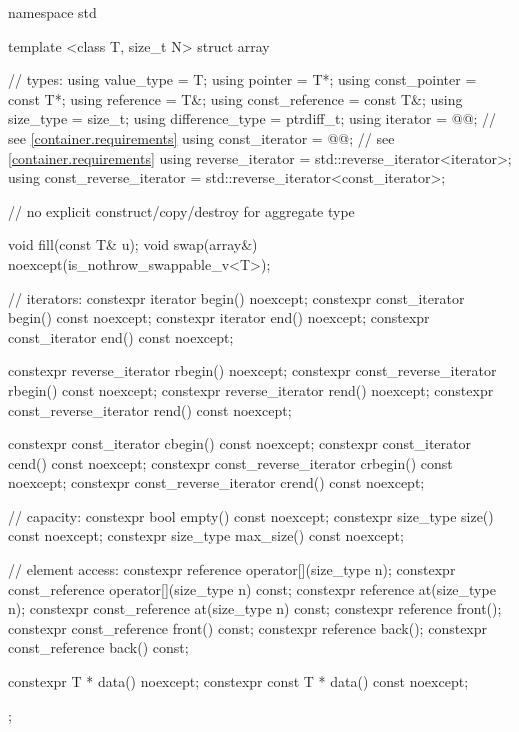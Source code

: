\begin{codeblock}
namespace std {
  template <class T, size_t N>
  struct array {
    //  types:
    using value_type             = T;
    using pointer                = T*;
    using const_pointer          = const T*;
    using reference              = T&;
    using const_reference        = const T&;
    using size_type              = size_t;
    using difference_type        = ptrdiff_t;
    using iterator               = @@; // see \ref{container.requirements}
    using const_iterator         = @@; // see \ref{container.requirements}
    using reverse_iterator       = std::reverse_iterator<iterator>;
    using const_reverse_iterator = std::reverse_iterator<const_iterator>;

    // no explicit construct/copy/destroy for aggregate type

    void fill(const T& u);
    void swap(array&) noexcept(is_nothrow_swappable_v<T>);

    // iterators:
    constexpr iterator               begin() noexcept;
    constexpr const_iterator         begin() const noexcept;
    constexpr iterator               end() noexcept;
    constexpr const_iterator         end() const noexcept;

    constexpr reverse_iterator       rbegin() noexcept;
    constexpr const_reverse_iterator rbegin() const noexcept;
    constexpr reverse_iterator       rend() noexcept;
    constexpr const_reverse_iterator rend() const noexcept;

    constexpr const_iterator         cbegin() const noexcept;
    constexpr const_iterator         cend() const noexcept;
    constexpr const_reverse_iterator crbegin() const noexcept;
    constexpr const_reverse_iterator crend() const noexcept;

    // capacity:
    constexpr bool      empty() const noexcept;
    constexpr size_type size() const noexcept;
    constexpr size_type max_size() const noexcept;

    // element access:
    constexpr reference       operator[](size_type n);
    constexpr const_reference operator[](size_type n) const;
    constexpr reference       at(size_type n);
    constexpr const_reference at(size_type n) const;
    constexpr reference       front();
    constexpr const_reference front() const;
    constexpr reference       back();
    constexpr const_reference back() const;

    constexpr T *       data() noexcept;
    constexpr const T * data() const noexcept;
  };
}
\end{codeblock}

